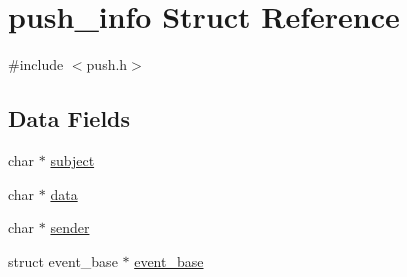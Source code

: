 \hypertarget{structpush__info}{\section{push\-\_\-info Struct Reference}
\label{structpush__info}
}


{\ttfamily \#include $<$push.\-h$>$}

\subsection*{Data Fields}
\begin{DoxyCompactItemize}
\item 
char $\ast$ \hyperlink{structpush__info_ae31ac864419a577c2982907c23b426d3}{subject}
\item 
char $\ast$ \hyperlink{structpush__info_a91a70b77df95bd8b0830b49a094c2acb}{data}
\item 
char $\ast$ \hyperlink{structpush__info_ab092ba1f84e458809eb91a5786b281de}{sender}
\item 
struct event\-\_\-base $\ast$ \hyperlink{structpush__info_ac1c1d71aa37cb71608f4f802bb85b200}{event\-\_\-base}
\end{DoxyCompactItemize}


